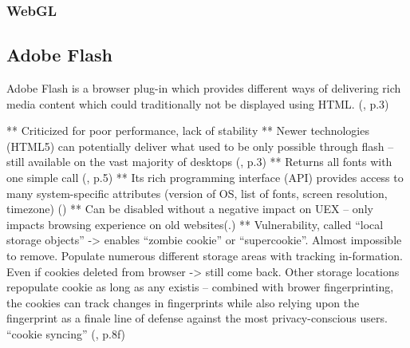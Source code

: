 \subsubsection{WebGL}\label{webgl}


\subsection{Adobe Flash}\label{adobe}
Adobe Flash is a browser plug-in which provides different ways of delivering rich media content which could traditionally not be displayed using HTML. (\textcite{nikiforakis13}, p.3)


**	Criticized for poor performance, lack of stability
**	Newer technologies (HTML5) can potentially deliver what used to be only possible through flash – still available on the vast majority of desktops (\textcite{nikiforakis13}, p.3)
**	Returns all fonts with one simple call (\textcite{havens16}, p.5)
**	Its rich programming interface (API) provides access to many system-specific attributes (version of OS, list of fonts, screen resolution, timezone) (\textcite{amiunique})
**	Can be disabled without a negative impact on UEX – only impacts browsing experience on old websites(\textcite{pixel18}.)
**	Vulnerability, called “local storage objects” -> enables “zombie cookie” or “supercookie”. Almost impossible to remove. Populate numerous different storage areas with tracking in-formation. Even if cookies deleted from browser -> still come back. Other storage locations repopulate cookie as long as any existis – combined with brower fingerprinting, the cookies can track changes in fingerprints while also relying upon the fingerprint as a finale line of defense against the most privacy-conscious users. “cookie syncing” (\textcite{havens16}, p.8f)

